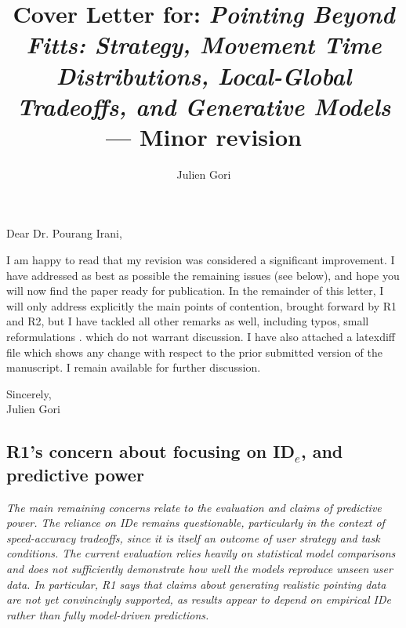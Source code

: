 \documentclass{article}
\title{Cover Letter for: \textit{Pointing Beyond Fitts: Strategy, Movement Time Distributions, Local-Global Tradeoffs, and Generative Models} --- Minor revision}
\author{Julien Gori}
\begin{document}
\maketitle

Dear Dr. Pourang Irani,

\vspace{2\baselineskip}

I am happy to read that my revision was considered a significant improvement. I have addressed as best as possible the remaining issues (see below), and hope you will now find the paper ready for publication.
In the remainder of this letter, I will only address explicitly the main points of contention, brought forward by R1 and R2, but I have tackled all other remarks as well, including typos, small reformulations \etc. which do not warrant discussion. I have also attached a latexdiff file which shows any change with respect to the prior submitted version of the manuscript.
I remain available for further discussion.

\begin{flushright}
  Sincerely,\\
  Julien Gori
\end{flushright}

\subsection*{R1's concern about focusing on ID$_e$, and predictive power}
\textit{The main remaining concerns relate to the evaluation and claims of predictive power. The reliance on IDe remains questionable, particularly in the context of speed-accuracy tradeoffs, since it is itself an outcome of user strategy and task conditions. The current evaluation relies heavily on statistical model comparisons and does not sufficiently demonstrate how well the models reproduce unseen user data. In particular, R1 says that claims about generating realistic pointing data are not yet convincingly supported, as results appear to depend on empirical IDe rather than fully model-driven predictions.}
\end{document}
